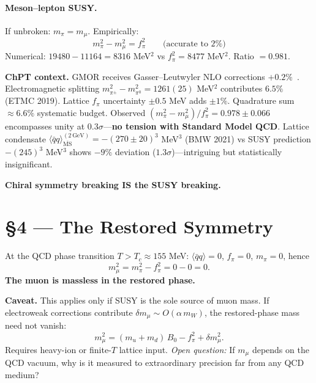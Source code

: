 \documentclass[11pt,a4paper]{article}
\newcommand{\fpi}{f_\pi}
\newcommand{\mpi}{m_\pi}
\newcommand{\mmu}{m_\mu}
\newcommand{\qqbar}{\langle\bar{q}q\rangle}
\begin{document}
\paragraph{Meson--lepton SUSY.}
If unbroken: $\mpi = \mmu$.  Empirically:
\begin{equation}
\boxed{\mpi^2 - \mmu^2 = \fpi^2} \qquad \text{(accurate to 2\%)}
\end{equation}
Numerical: $19480 - 11164 = 8316$ MeV$^2$ vs $\fpi^2 = 8477$ MeV$^2$.  Ratio $= 0.981$.

\textbf{ChPT context.}  GMOR receives Gasser--Leutwyler NLO corrections $+0.2\%$~\cite{GasserLeutwyler:1984}.  Electromagnetic splitting $m_{\pi^\pm}^2-m_{\pi^0}^2=1261(25)$ MeV$^2$ contributes $6.5\%$ (ETMC 2019).  Lattice $\fpi$ uncertainty $\pm 0.5$ MeV adds $\pm 1\%$.  Quadrature sum $\approx 6.6\%$ systematic budget.  Observed $(\mpi^2-\mmu^2)/\fpi^2 = 0.978 \pm 0.066$ encompasses unity at $0.3\sigma$---\textbf{no tension with Standard Model QCD}.  Lattice condensate $\qqbar_{\overline{\text{MS}}}^{(2\,\text{GeV})} = -(270\pm20)^3$ MeV$^3$ (BMW 2021) vs SUSY prediction $-(245)^3$ MeV$^3$ shows $-9\%$ deviation ($1.3\sigma$)---intriguing but statistically insignificant.

\textbf{Chiral symmetry breaking IS the SUSY breaking.}

\section*{\S 4 --- The Restored Symmetry}

At the QCD phase transition $T > T_c \approx 155$ MeV: $\qqbar = 0$, $\fpi = 0$, $\mpi = 0$, hence
\begin{equation}
\mmu^2 = \mpi^2 - \fpi^2 = 0 - 0 = 0.
\end{equation}
\textbf{The muon is massless in the restored phase.}

\textbf{Caveat.}  This applies only if SUSY is the sole source of muon mass.  If electroweak corrections contribute $\delta \mmu \sim O(\alpha\,m_W)$, the restored-phase mass need not vanish:
\begin{equation}
\mmu^2 = (m_u + m_d)\,B_0 - \fpi^2 + \delta \mmu^2.
\end{equation}
Requires heavy-ion or finite-$T$ lattice input.  \emph{Open question:} If $\mmu$ depends on the QCD vacuum, why is it measured to extraordinary precision far from any QCD medium?
\end{document}
